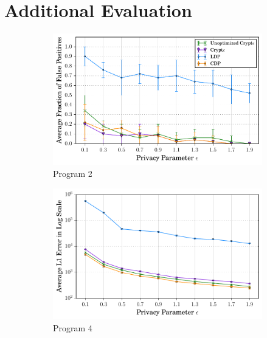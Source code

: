 \section{Additional Evaluation}\label{app:evaluation}

\begin{figure}
    \begin{subfigure}[b]{0.25\linewidth}
        \centering
         \includegraphics[width=1\linewidth]{2_final.pdf}
        \caption{ Program 2}
        \label{fig:P2}
    \end{subfigure}
    \begin{subfigure}[b]{0.25\linewidth}
    \centering \includegraphics[width=1\linewidth]{4_final.pdf}
        \caption{Program 4}
        \label{fig:P4}\end{subfigure}
    \begin{subfigure}[b]{0.25\linewidth}

\end{subfigure}
\end{figure}
